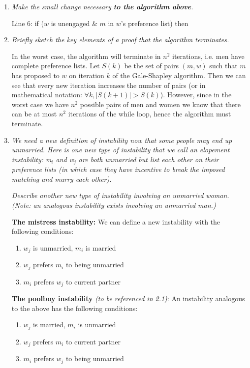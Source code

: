 \documentclass[11pt, oneside]{article}   	%
\theoremstyle{definition}
\theoremstyle{remark}
\begin{document}
\begin{enumerate}
	\item \textit{Make the small change necessary \textbf{to the algorithm above}.}
	
	\qquad Line 6: if ($w$ is unengaged \& $m$ in $w$'s preference list) then
	\item \textit{Briefly sketch the key elements of a proof that the algorithm terminates.}
	
	In the worst case, the algorithm will terminate in $n^2$ iterations, i.e. men have complete preference lists. Let $S(k)$ be the set of pairs $(m, w)$ such that $m$ has proposed to $w$ on iteration $k$ of the Gale-Shapley algorithm. Then we can see that every new iteration increases the number of pairs (or in mathematical notation: $\forall k, |S(k+1)| > S(k)$). However, since in the worst case we have $n^2$ possible pairs of men and women we know that there can be at most $n^2$ iterations of the while loop, hence the algorithm must terminate.
	
	
	\item \textit{We need a new definition of instability now that some people may end up unmarried. Here is one new type of instability that we call an \emph{elopement instability}: m$_i$ and w$_j$ are both unmarried but list each other on their preference lists (in which case they have incentive to break the imposed matching and marry each other).}
   
   \textit{Describe another new type of instability involving an unmarried woman. (Note: an analogous instability exists involving an unmarried man.)}
   
   \textbf{The mistress instability:} We can define a new instability with the following conditions:
   		\begin{enumerate}
   			\item $w_j$ is unmarried, $m_i$ is married
   			\item $w_j$ prefers $m_i$ to being unmarried 
   			\item $m_i$ prefers $w_j$ to current partner
   
   \end{enumerate}
   \textbf{The poolboy instability} \textit{(to be referenced in 2.1)}: An instability analogous to the above has the following conditions: 
   \begin{enumerate}
   			\item $w_j$ is married, $m_i$ is unmarried
   			\item $w_j$ prefers $m_i$ to current partner
   			\item $m_i$ prefers $w_j$ to being unmarried
   

\end{enumerate}
\end{enumerate}
\end{document}
